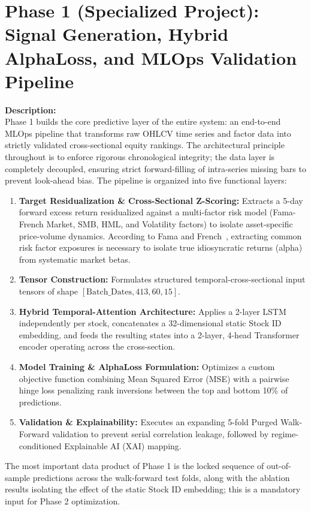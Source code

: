 \documentclass[twoside,final]{hcmut-report}
\begin{document}
\section{Phase 1 (Specialized Project): Signal Generation, Hybrid AlphaLoss, and MLOps Validation Pipeline}

\textbf{Description:} \\
Phase 1 builds the core predictive layer of the entire system: an end-to-end MLOps pipeline that transforms raw OHLCV time series and factor data into strictly validated cross-sectional equity rankings. The architectural principle throughout is to enforce rigorous chronological integrity; the data layer is completely decoupled, ensuring strict forward-filling of intra-series missing bars to prevent look-ahead bias. The pipeline is organized into five functional layers:
\begin{enumerate}
    \item \textbf{Target Residualization \& Cross-Sectional Z-Scoring:} Extracts a 5-day forward excess return residualized against a multi-factor risk model (Fama-French Market, SMB, HML, and Volatility factors) to isolate asset-specific price-volume dynamics. According to Fama and French~\cite{FamaFrench1993}, extracting common risk factor exposures is necessary to isolate true idiosyncratic returns (alpha) from systematic market betas.
    \item \textbf{Tensor Construction:} Formulates structured temporal-cross-sectional input tensors of shape $[\text{Batch\_Dates}, 413, 60, 15]$.
    \item \textbf{Hybrid Temporal-Attention Architecture:} Applies a 2-layer LSTM independently per stock, concatenates a 32-dimensional static Stock ID embedding, and feeds the resulting states into a 2-layer, 4-head Transformer encoder operating across the cross-section.
    \item \textbf{Model Training \& AlphaLoss Formulation:} Optimizes a custom objective function combining Mean Squared Error (MSE) with a pairwise hinge loss penalizing rank inversions between the top and bottom 10\% of predictions.
    \item \textbf{Validation \& Explainability:} Executes an expanding 5-fold Purged Walk-Forward validation to prevent serial correlation leakage, followed by regime-conditioned Explainable AI (XAI) mapping.
\end{enumerate}

The most important data product of Phase 1 is the locked sequence of out-of-sample predictions across the walk-forward test folds, along with the ablation results isolating the effect of the static Stock ID embedding; this is a mandatory input for Phase 2 optimization.
\end{document}
